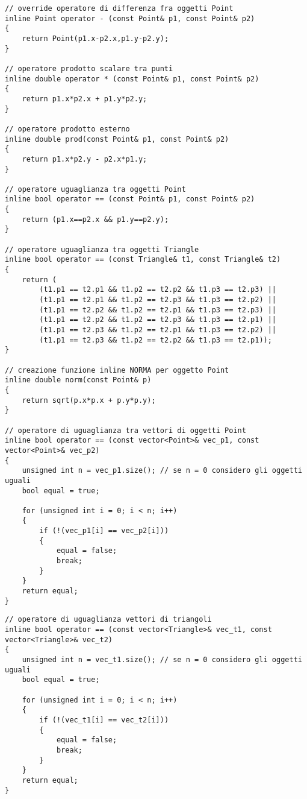 \documentclass{article}
\begin{document}
\begin{lstlisting}
// override operatore di differenza fra oggetti Point
inline Point operator - (const Point& p1, const Point& p2)
{
    return Point(p1.x-p2.x,p1.y-p2.y);
}

// operatore prodotto scalare tra punti
inline double operator * (const Point& p1, const Point& p2)
{
    return p1.x*p2.x + p1.y*p2.y;
}

// operatore prodotto esterno
inline double prod(const Point& p1, const Point& p2)
{
    return p1.x*p2.y - p2.x*p1.y;
}

// operatore uguaglianza tra oggetti Point
inline bool operator == (const Point& p1, const Point& p2)
{
    return (p1.x==p2.x && p1.y==p2.y);
}

// operatore uguaglianza tra oggetti Triangle
inline bool operator == (const Triangle& t1, const Triangle& t2)
{
    return (
        (t1.p1 == t2.p1 && t1.p2 == t2.p2 && t1.p3 == t2.p3) ||
        (t1.p1 == t2.p1 && t1.p2 == t2.p3 && t1.p3 == t2.p2) ||
        (t1.p1 == t2.p2 && t1.p2 == t2.p1 && t1.p3 == t2.p3) ||
        (t1.p1 == t2.p2 && t1.p2 == t2.p3 && t1.p3 == t2.p1) ||
        (t1.p1 == t2.p3 && t1.p2 == t2.p1 && t1.p3 == t2.p2) ||
        (t1.p1 == t2.p3 && t1.p2 == t2.p2 && t1.p3 == t2.p1));
}

// creazione funzione inline NORMA per oggetto Point
inline double norm(const Point& p)
{
    return sqrt(p.x*p.x + p.y*p.y);
}

// operatore di uguaglianza tra vettori di oggetti Point
inline bool operator == (const vector<Point>& vec_p1, const vector<Point>& vec_p2)
{
    unsigned int n = vec_p1.size(); // se n = 0 considero gli oggetti uguali
    bool equal = true;

    for (unsigned int i = 0; i < n; i++)
    {
        if (!(vec_p1[i] == vec_p2[i]))
        {
            equal = false;
            break;
        }
    }
    return equal;
}
\end{lstlisting}
\newpage
\begin{lstlisting}
// operatore di uguaglianza vettori di triangoli
inline bool operator == (const vector<Triangle>& vec_t1, const vector<Triangle>& vec_t2)
{
    unsigned int n = vec_t1.size(); // se n = 0 considero gli oggetti uguali
    bool equal = true;

    for (unsigned int i = 0; i < n; i++)
    {
        if (!(vec_t1[i] == vec_t2[i]))
        {
            equal = false;
            break;
        }
    }
    return equal;
}
\end{lstlisting}
\end{document}
